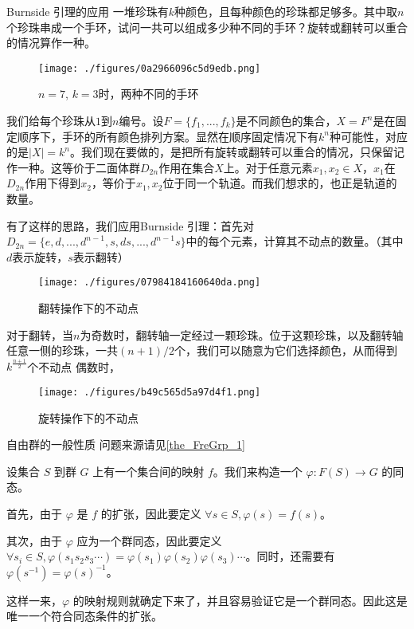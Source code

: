 \begin{example}{Burnside 引理的应用}
一堆珍珠有$k$种颜色，且每种颜色的珍珠都足够多。其中取$n$个珍珠串成一个手环，试问一共可以组成多少种不同的手环？旋转或翻转可以重合的情况算作一种。

\begin{figure}[ht]
\centering
\texttt{[image: ./figures/0a2966096c5d9edb.png]}
\caption{$n=7$, $k=3$时，两种不同的手环} \label{fig_GroupP_1}
\end{figure}

我们给每个珍珠从$1$到$n$编号。设$F=\{f_1,...,f_k\}$是不同颜色的集合，$X=F^n$是在固定顺序下，手环的所有颜色排列方案。显然在顺序固定情况下有$k^n$种可能性，对应的是$|X|=k^n$。我们现在要做的，是把所有旋转或翻转可以重合的情况，只保留记作一种。这等价于二面体群$D_{2n}$作用在集合$X$上。对于任意元素$x_1,x_2\in X$，$x_1$在$D_{2n}$作用下得到$x_2$，等价于$x_1,x_2$位于同一个轨道。而我们想求的，也正是轨道的数量。

有了这样的思路，我们应用Burnside 引理：首先对$D_{2n}=\{e,d,...,d^{n-1},s,ds,...,d^{n-1}s\}$中的每个元素，计算其不动点的数量。（其中$d$表示旋转，$s$表示翻转）

\begin{figure}[ht]
\centering
\texttt{[image: ./figures/07984184160640da.png]}
\caption{翻转操作下的不动点} \label{fig_GroupP_2}
\end{figure}

对于翻转，当$n$为奇数时，翻转轴一定经过一颗珍珠。位于这颗珍珠，以及翻转轴任意一侧的珍珠，一共$(n+1)/2$个，我们可以随意为它们选择颜色，从而得到$k^\frac{n+1}{2}$个不动点 偶数时，

\begin{figure}[ht]
\centering
\texttt{[image: ./figures/b49c565d5a97d4f1.png]}
\caption{旋转操作下的不动点} \label{fig_GroupP_3}
\end{figure}
\end{example}




\begin{example}{自由群的一般性质}\label{ex_GroupP_4}
问题来源请见\autoref{the_FreGrp_1}~

设集合 $S$ 到群 $G$ 上有一个集合间的映射 $f$。我们来构造一个 $\varphi: F(S)\rightarrow G$ 的同态。

首先，由于 $\varphi$ 是 $f$ 的扩张，因此要定义 $\forall s\in S, \varphi(s)=f(s)$。

其次，由于 $\varphi$ 应为一个群同态，因此要定义 $\forall s_i\in S, \varphi({s_1s_2s_3\cdots})=\varphi(s_1)\varphi(s_2)\varphi(s_3)\cdots$。同时，还需要有 $\varphi(s^{-1})=\varphi(s)^{-1}$。

这样一来，$\varphi$ 的映射规则就确定下来了，并且容易验证它是一个群同态。因此这是唯一一个符合同态条件的扩张。


\end{example}
